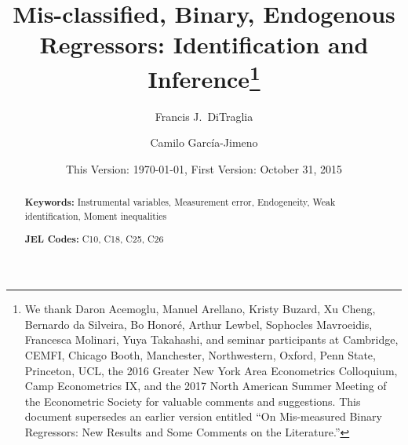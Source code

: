 \documentclass[12pt]{article}
\title{Mis-classified, Binary, Endogenous Regressors: Identification and Inference\footnote{We thank Daron Acemoglu, Manuel Arellano, Kristy Buzard, Xu Cheng, Bernardo da Silveira, Bo Honor\'{e}, Arthur Lewbel, Sophocles Mavroeidis, Francesca Molinari, Yuya Takahashi, and seminar participants at Cambridge, CEMFI, Chicago Booth, Manchester, Northwestern, Oxford, Penn State, Princeton, UCL, the 2016 Greater New York Area Econometrics Colloquium, Camp Econometrics IX, and the 2017 North American Summer Meeting of the Econometric Society for valuable comments and suggestions. This document supersedes an earlier version entitled ``On Mis-measured Binary Regressors: New Results and Some Comments on the Literature.''}}
\author[1]{Francis J.\ DiTraglia}
\author[1,2]{Camilo Garc\'{i}a-Jimeno}
\affil[1]{\normalsize Department of Economics, University of Pennsylvania}
\affil[2]{\normalsize NBER}
\date{\small This Version: \today, First Version: October 31, 2015}
\begin{document}
\maketitle


\begin{abstract}
  \singlespacing
	

  	\bigskip
	\noindent\textbf{Keywords:} Instrumental variables, Measurement error, Endogeneity,  Weak identification, Moment inequalities 

	\medskip
  \noindent\textbf{JEL Codes:} C10, C18, C25, C26
\end{abstract}

\newpage







\appendix
{}
\singlespacing \small


\normalsize

%





\normalsize
\clearpage
{}%
\renewcommand*{\thepage}{D-\arabic{page}}


%
%
\end{document}
